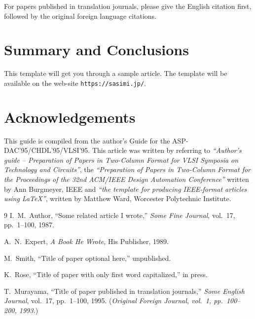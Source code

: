 \documentclass[twocolumn,a4paper]{article}
\begin{document}
For papers published in translation journals, please give the English
citation first, followed by the original foreign language
citations\cite{trans}.


\section{Summary and Conclusions}
This template will get you through a sample article.  The template
will be available on the web-site \verb|https://sasimi.jp/|.



\section*{\sc Acknowledgements}
This guide is compiled from the author's Guide for the
ASP-DAC'95/CHDL'95/VLSI'95.
This article was written by referring to {\em ``Author's guide --
Preparation of Papers in Two-Column Format for VLSI Symposia on
Technology and Circuits''}, the {\em ``Preparation of Papers in
Two-Column Format for the Proceedings of the 32nd ACM/IEEE Design
Automation Conference''} written by Ann Burgmeyer, IEEE and {\em ``the
template for producing IEEE-format articles using LaTeX''}, written by
Matthew Ward, Worcester Polytechnic Institute.


\begin{thebibliography}{9}
\footnotesize
{}
I.~M.~Author,
``Some related article I wrote,''
{\em Some Fine Journal}, vol.~17, pp.~1--100, 1987.

A.~N.~Expert,
{\em A Book He Wrote,}
His Publisher, 1989.

M.~Smith,
``Title of paper optional here,''
unpublished.

K.~Rose,
``Title of paper with only first word capitalized,''
in press.

T.~Murayama,
``Title of paper published in translation journals,''
{\em Some English Journal}, vol.~17, pp.~1--100, 1995.
({\em Original Foreign Journal, vol.~1, pp.~100--200, 1993.})


\end{thebibliography}
\end{document}
